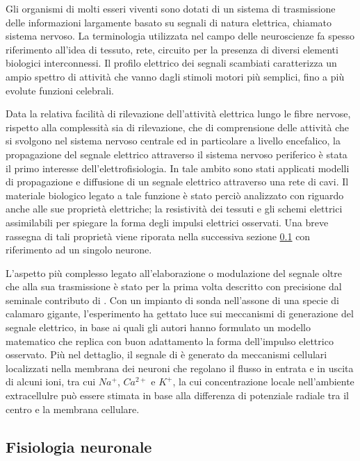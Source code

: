 Gli organismi di molti esseri viventi sono dotati di un sistema di trasmissione delle informazioni largamente basato su segnali di natura elettrica, chiamato sistema nervoso. La terminologia utilizzata nel campo delle neuroscienze fa spesso riferimento all'idea di tessuto, rete, circuito per la presenza di diversi elementi biologici interconnessi. Il profilo elettrico dei segnali scambiati caratterizza un ampio spettro di attività che vanno dagli stimoli motori più semplici, fino a più evolute funzioni celebrali.

Data la relativa facilità di rilevazione dell'attività elettrica lungo le fibre nervose, rispetto alla complessità sia di rilevazione, che di comprensione delle attività che si svolgono nel sistema nervoso centrale ed in particolare a livello encefalico, la propagazione del segnale elettrico attraverso il sistema nervoso periferico è stata il primo interesse dell'elettrofisiologia. In tale ambito sono stati applicati modelli di propagazione e diffusione di un segnale elettrico attraverso una rete di cavi. Il materiale biologico legato a tale funzione è stato perciò analizzato con riguardo anche alle sue proprietà elettriche; la resistività dei tessuti e gli schemi elettrici assimilabili per spiegare la forma degli impulsi elettrici osservati. Una breve rassegna di tali proprietà viene riporata nella successiva sezione \ref{sez:Fisiologia} con riferimento ad un singolo neurone.

L'aspetto più complesso legato all'elaborazione o modulazione del segnale oltre che alla sua trasmissione è stato per la prima volta descritto con precisione dal seminale contributo di \cite{Hodgkin1952}. Con un impianto di sonda nell'assone di una specie di calamaro gigante, l'esperimento ha gettato luce sui meccanismi di generazione del segnale elettrico, in base ai quali gli autori hanno formulato un modello matematico che replica con buon adattamento la forma dell'impulso elettrico osservato. Più nel dettaglio, il segnale di \cite{Hodgkin1952} è generato da meccanismi cellulari localizzati nella membrana dei neuroni che regolano il flusso in entrata e in uscita di alcuni ioni, tra cui $Na^{+}$, $Ca^{2+}$ e $K^{+}$, la cui concentrazione locale nell'ambiente extracellulre può essere stimata in base alla differenza di potenziale radiale tra il centro e la membrana cellulare.



\subsection{Fisiologia neuronale}
\label{sez:Fisiologia}

